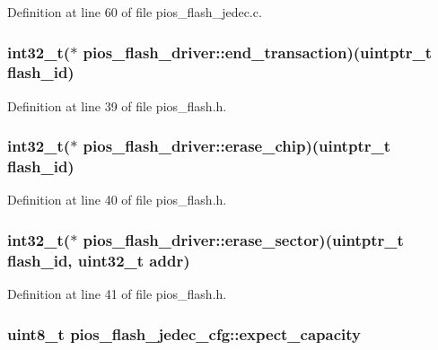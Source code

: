 \-Definition at line 60 of file pios\-\_\-flash\-\_\-jedec.\-c.

\hypertarget{group___p_i_o_s___f_l_a_s_h_ga775db43adcb0c42ede668aef36016301}{
\subsubsection[{end\-\_\-transaction}]{\setlength{\rightskip}{0pt plus 5cm}int32\-\_\-t($\ast$ {\bf pios\-\_\-flash\-\_\-driver\-::end\-\_\-transaction})(uintptr\-\_\-t flash\-\_\-id)}}\label{group___p_i_o_s___f_l_a_s_h_ga775db43adcb0c42ede668aef36016301}


\-Definition at line 39 of file pios\-\_\-flash.\-h.

\hypertarget{group___p_i_o_s___f_l_a_s_h_ga38768b3295a563897e91191bfead95b5}{
\subsubsection[{erase\-\_\-chip}]{\setlength{\rightskip}{0pt plus 5cm}int32\-\_\-t($\ast$ {\bf pios\-\_\-flash\-\_\-driver\-::erase\-\_\-chip})(uintptr\-\_\-t flash\-\_\-id)}}\label{group___p_i_o_s___f_l_a_s_h_ga38768b3295a563897e91191bfead95b5}


\-Definition at line 40 of file pios\-\_\-flash.\-h.

\hypertarget{group___p_i_o_s___f_l_a_s_h_ga91676d432517e3a2ea7303a07cd1bde3}{
\subsubsection[{erase\-\_\-sector}]{\setlength{\rightskip}{0pt plus 5cm}int32\-\_\-t($\ast$ {\bf pios\-\_\-flash\-\_\-driver\-::erase\-\_\-sector})(uintptr\-\_\-t flash\-\_\-id, uint32\-\_\-t addr)}}\label{group___p_i_o_s___f_l_a_s_h_ga91676d432517e3a2ea7303a07cd1bde3}


\-Definition at line 41 of file pios\-\_\-flash.\-h.

\hypertarget{group___p_i_o_s___f_l_a_s_h_ga33911ac74387cebdbc4bb2fe3d5541a6}{
\subsubsection[{expect\-\_\-capacity}]{\setlength{\rightskip}{0pt plus 5cm}uint8\-\_\-t {\bf pios\-\_\-flash\-\_\-jedec\-\_\-cfg\-::expect\-\_\-capacity}}}\label{group___p_i_o_s___f_l_a_s_h_ga33911ac74387cebdbc4bb2fe3d5541a6}


